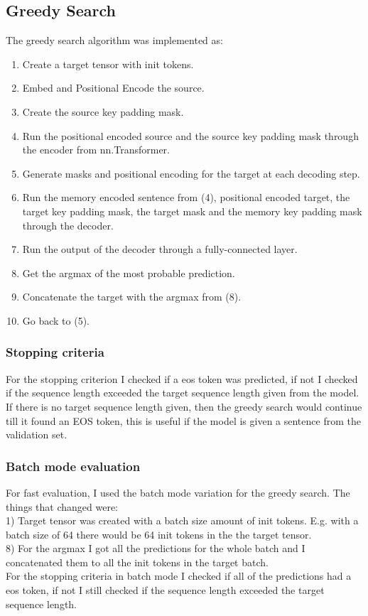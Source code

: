 \documentclass{article}
\begin{document}
\subsection{Greedy Search}
The greedy search algorithm was implemented as:
\begin{enumerate}
    \item Create a target tensor with init tokens.
    \item Embed and Positional Encode the source.
    \item Create the source key padding mask.
    \item Run the positional encoded source and the source key padding mask through the encoder from nn.Transformer.
    \item Generate masks and positional encoding for the target at each decoding step.
    \item Run the memory encoded sentence from (4), positional encoded target, the target key padding mask, the target mask and the memory key padding mask through the decoder.
    \item Run the output of the decoder through a fully-connected layer.
    \item Get the argmax of the most probable prediction.
    \item Concatenate the target with the argmax from (8).
    \item Go back to (5).
\end{enumerate}
\subsubsection{Stopping criteria}
For the stopping criterion I checked if a eos token was predicted, if not I checked if the sequence length exceeded the target sequence length given from the model. If there is no target sequence length given, then the greedy search would continue till it found an EOS token, this is useful if the model is given a sentence from the validation set.
\subsubsection{Batch mode evaluation}
For fast evaluation, I used the batch mode variation for the greedy search. The things that changed were:\\
1) Target tensor was created with a batch size amount of init tokens. E.g. with a batch size of 64 there would be 64 init tokens in the the target tensor.\\
8) For the argmax I got all the predictions for the whole batch and I concatenated them to all the init tokens in the target batch.
\\
For the stopping criteria in batch mode I checked if all of the predictions had a eos token, if not I still checked if the sequence length exceeded the target sequence length.
\end{document}
